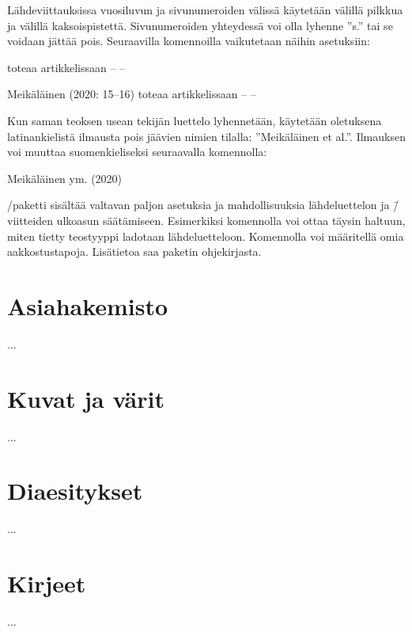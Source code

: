 Lähdeviittauksissa vuosiluvun ja sivunumeroiden välissä käytetään
välillä pilkkua ja välillä kaksoispistettä. Sivunumeroiden yhteydessä
voi olla lyhenne ''s.'' tai se voidaan jättää pois. Seuraavilla
komennoilla vaikutetaan näihin asetuksiin:

\begin{koodilohkosis}

  \textcite[15--16]{tunniste} toteaa artikkelissaan -- --
\end{koodilohkosis}

\begin{tulossis}
  Meikäläinen (2020: 15--16) toteaa artikkelissaan -- --
\end{tulossis}

Kun saman teoksen usean tekijän luettelo lyhennetään, käytetään
oletuksena latinankielistä ilmausta pois jäävien nimien tilalla:
''Meikäläinen et al.''. Ilmauksen voi muuttaa suomenkieliseksi
seuraavalla komennolla:

\begin{koodilohkosis}
\end{koodilohkosis}

\begin{tulossis}
  Meikäläinen ym. (2020)
\end{tulossis}

\-/paketti sisältää valtavan paljon asetuksia ja
mahdollisuuksia lähdeluettelon ja \=/viitteiden ulkoasun säätämiseen.
Esimerkiksi komennolla  voi ottaa
täysin haltuun, miten tietty teostyyppi ladotaan lähdeluetteloon.
Komennolla  voi määritellä omia
aakkostustapoja. Lisätietoa saa paketin ohjekirjasta.%

\section{Asiahakemisto}
\label{luku:asiasanat}

...

\section{Kuvat ja värit}
\label{luku:grafiikka}

...

\section{Diaesitykset}
\label{luku:diaesitykset}

...

\section{Kirjeet}
\label{luku:kirjeet}

...
